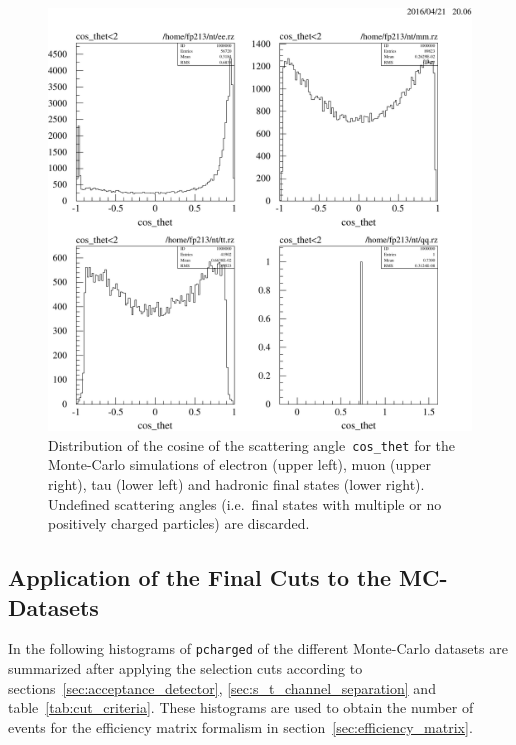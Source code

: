 \documentclass[11pt, a4paper]{article}
\numberwithin{equation}{section}
\begin{document}
\begin{appendix}
\begin{figure}[h]
	\centering
	\includegraphics[width=1\textwidth]{./data/tag2/angular_mc/cropped/cos_theta.pdf}
	\caption{Distribution of the cosine of the scattering angle~\texttt{cos\_thet} for the Monte-Carlo simulations of electron (upper left), muon (upper right), tau (lower left) and hadronic final states (lower right). Undefined scattering angles (i.e.\ final states with multiple or no positively charged particles) are discarded.}
	\label{fig:cos_theta_uncut}
\end{figure}

\clearpage
\subsection{Application of the Final Cuts to the MC-Datasets}
\label{app:mc_final_cut}
In the following histograms of \texttt{pcharged} of the different Monte-Carlo datasets are summarized after applying the selection cuts according to sections~\ref{sec:acceptance_detector}, \ref{sec:s_t_channel_separation} and table~\ref{tab:cut_criteria}.
These histograms are used to obtain the number of events for the efficiency matrix formalism in section~\ref{sec:efficiency_matrix}.


\end{appendix}
\end{document}

